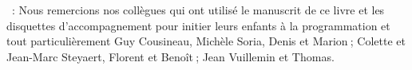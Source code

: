 \vfill
{}~: Nous remercions nos collègues qui ont utilisé le
manuscrit de ce livre et les disquettes d'accompagnement
pour initier leurs enfants à la programmation et tout
particulièrement Guy Cousineau, Michèle Soria,  Denis et
Marion$\:$; Colette et Jean-Marc Steyaert, Florent et Benoît$\:$; 
Jean Vuillemin et Thomas.